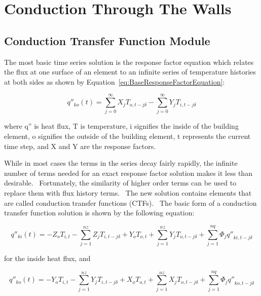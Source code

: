 \section{Conduction Through The Walls}\label{conduction-through-the-walls}

\subsection{Conduction Transfer Function Module}\label{conduction-transfer-function-module}

The most basic time series solution is the response factor equation which relates the flux at one surface of an element to an infinite series of temperature histories at both sides as shown by Equation~\ref{eq:BaseResponseFactorEquation}:

\begin{equation}
{q''_{ko}}(t) = \sum\limits_{j = 0}^\infty  {{X_j}} {T_{o,t - j\delta }} - \sum\limits_{j = 0}^\infty  {{Y_j}} {T_{i,t - j\delta }}
\label{eq:BaseResponseFactorEquation}
\end{equation}

where q'' is heat flux, T is temperature, i signifies the inside of the building element, o signifies the outside of the building element, t represents the current time step, and X and Y are the response factors.

While in most cases the terms in the series decay fairly rapidly, the infinite number of terms needed for an exact response factor solution makes it less than desirable.~ Fortunately, the similarity of higher order terms can be used to replace them with flux history terms.~ The new solution contains elements that are called conduction transfer functions (CTFs).~ The basic form of a conduction transfer function solution is shown by the following equation:

\begin{equation}
{q''_{ki}}(t) =  - {Z_o}{T_{i,t}} - \sum\limits_{j = 1}^{nz} {{Z_j}} {T_{i,t - j\delta }} + {Y_o}{T_{o,t}} + \sum\limits_{j = 1}^{nz} {{Y_j}} {T_{o,t - j\delta }} + \sum\limits_{j = 1}^{nq} {{\Phi_j}{{q''}_{ki,t - j\delta }}}
\end{equation}

for the inside heat flux, and

\begin{equation}
{q''_{ko}}(t) =  - {Y_o}{T_{i,t}} - \sum\limits_{j = 1}^{nz} {{Y_j}} {T_{i,t - j\delta }} + {X_o}{T_{o,t}} + \sum\limits_{j = 1}^{nz} {{X_j}} {T_{o,t - j\delta }} + \sum\limits_{j = 1}^{nq} {{\Phi_j}{{q''}_{ko,t - j\delta }}}
\end{equation}

